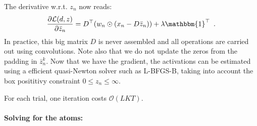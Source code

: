 The derivative w.r.t. $z_n$ now reads:
\begin{equation}
\frac{\partial \mathcal{L}(d, z)}{\partial \bar{z}_n}
= D^\top(w_n \odot (x_n - D\bar{z}_n)) + \lambda \mathbbm{1}^\top \enspace .
\end{equation}
In practice, this big matrix $D$ is never assembled and all operations are carried out using convolutions. Note also that we do not update the zeros from the padding in $\bar{z}_n^k$. Now that we have the gradient, the activations can be estimated using a efficient quasi-Newton solver such as L-BFGS-B, taking into account the box posititivy constraint $0 \leq z_n \leq \infty$.

For each trial, one iteration costs $\mathcal{O}(LKT)$.

\paragraph{Solving for the atoms: }


